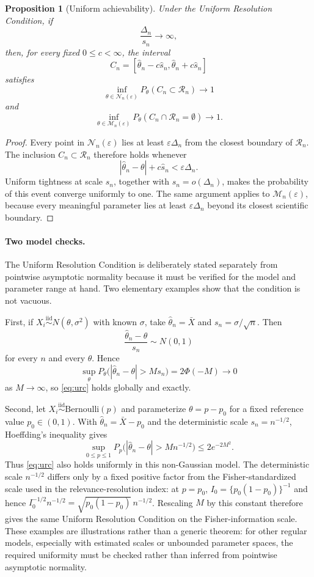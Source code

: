 \documentclass[11pt]{article}
\newtheorem{proposition}{Proposition}
\theoremstyle{remark}
\begin{document}
\begin{proposition}[Uniform achievability]
\label{prop:uniform}
Under the Uniform Resolution Condition, if
\[
\frac{\Delta_n}{s_n}\to\infty,
\]
then, for every fixed $0\le c<\infty$, the interval
\[
C_n=[\hat\theta_n-c\hat s_n,\hat\theta_n+c\hat s_n]
\]
satisfies
\[
\inf_{\theta\in\mathcal N_n(\varepsilon)}P_\theta(C_n\subset\mathcal R_n)\to1
\]
and
\[
\inf_{\theta\in\mathcal M_n(\varepsilon)}P_\theta(C_n\cap\mathcal R_n=\emptyset)\to1.
\]
\end{proposition}

\begin{proof}
Every point in $\mathcal N_n(\varepsilon)$ lies at least $\varepsilon\Delta_n$ from the closest boundary of $\mathcal R_n$. The inclusion $C_n\subset\mathcal R_n$ therefore holds whenever
\[
|\hat\theta_n-\theta|+c\hat s_n<\varepsilon\Delta_n.
\]
Uniform tightness at scale $s_n$, together with $s_n=o(\Delta_n)$, makes the probability of this event converge uniformly to one. The same argument applies to $\mathcal M_n(\varepsilon)$, because every meaningful parameter lies at least $\varepsilon\Delta_n$ beyond its closest scientific boundary.
\end{proof}

\paragraph{Two model checks.}
The Uniform Resolution Condition is deliberately stated separately from pointwise asymptotic normality because it must be verified for the model and parameter range at hand. Two elementary examples show that the condition is not vacuous.

First, if $X_i\stackrel{\mathrm{iid}}{\sim}N(\theta,\sigma^2)$ with known $\sigma$, take $\hat\theta_n=\bar X$ and $s_n=\sigma/\sqrt n$. Then
\[
\frac{\hat\theta_n-\theta}{s_n}\sim N(0,1)
\]
for every $n$ and every $\theta$. Hence
\[
\sup_{\theta}P_\theta\bigl(|\hat\theta_n-\theta|>Ms_n\bigr)
=2\Phi(-M)\longrightarrow0
\]
as $M\to\infty$, so \eqref{eq:urc} holds globally and exactly.

Second, let $X_i\stackrel{\mathrm{iid}}{\sim}\mathrm{Bernoulli}(p)$ and parameterize $\theta=p-p_0$ for a fixed reference value $p_0\in(0,1)$. With $\hat\theta_n=\bar X-p_0$ and the deterministic scale $s_n=n^{-1/2}$, Hoeffding's inequality gives
\[
\sup_{0\le p\le1}
P_p\bigl(|\hat\theta_n-\theta|>M n^{-1/2}\bigr)
\le 2e^{-2M^2}.
\]
Thus \eqref{eq:urc} also holds uniformly in this non-Gaussian model. The deterministic scale $n^{-1/2}$ differs only by a fixed positive factor from the Fisher-standardized scale used in the relevance-resolution index: at $p=p_0$, $I_0=\{p_0(1-p_0)\}^{-1}$ and hence $I_0^{-1/2}n^{-1/2}=\sqrt{p_0(1-p_0)}\,n^{-1/2}$. Rescaling $M$ by this constant therefore gives the same Uniform Resolution Condition on the Fisher-information scale. These examples are illustrations rather than a generic theorem: for other regular models, especially with estimated scales or unbounded parameter spaces, the required uniformity must be checked rather than inferred from pointwise asymptotic normality.
\end{document}
